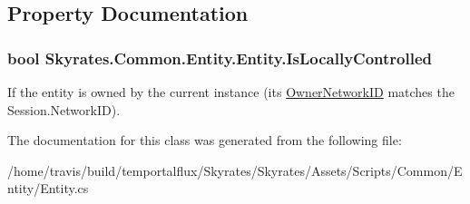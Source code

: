 \subsection{Property Documentation}
\hypertarget{class_skyrates_1_1_common_1_1_entity_1_1_entity_a76d0593a8dd6b00bf329fb9693577cef}{
\subsubsection[{Is\-Locally\-Controlled}]{\setlength{\rightskip}{0pt plus 5cm}bool Skyrates.\-Common.\-Entity.\-Entity.\-Is\-Locally\-Controlled\hspace{0.3cm}{\ttfamily [get]}}}\label{class_skyrates_1_1_common_1_1_entity_1_1_entity_a76d0593a8dd6b00bf329fb9693577cef}


If the entity is owned by the current instance (its \hyperlink{class_skyrates_1_1_common_1_1_entity_1_1_entity_a855cbcf588c2b4c490c2ddc157e11029}{Owner\-Network\-I\-D} matches the Session.\-Network\-I\-D). 



The documentation for this class was generated from the following file\-:\begin{DoxyCompactItemize}
\item 
/home/travis/build/temportalflux/\-Skyrates/\-Skyrates/\-Assets/\-Scripts/\-Common/\-Entity/Entity.\-cs\end{DoxyCompactItemize}
